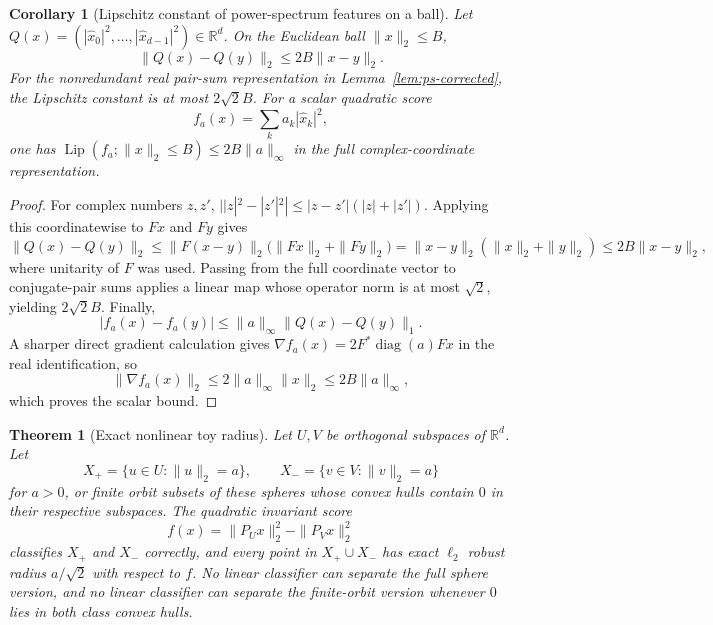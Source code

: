 \documentclass[11pt]{article}
\theoremstyle{plain}
\newtheorem{theorem}{Theorem}
\newtheorem{corollary}{Corollary}
\theoremstyle{definition}
\theoremstyle{remark}
\newcommand{\R}{\mathbb{R}}
\newcommand{\Lip}{\operatorname{Lip}}
\begin{document}
\begin{corollary}[Lipschitz constant of power-spectrum features on a ball]\label{cor:ps-lip}
Let $Q(x)=(|\hat x_0|^2,\ldots,|\hat x_{d-1}|^2)\in\R^d$.  On the Euclidean ball $\|x\|_2\le B$,
\[
\|Q(x)-Q(y)\|_2\le 2B\|x-y\|_2.
\]
For the nonredundant real pair-sum representation in Lemma~\ref{lem:ps-corrected}, the Lipschitz constant is at most $2\sqrt2 B$.  For a scalar quadratic score
\[
f_a(x)=\sum_k a_k|\hat x_k|^2,
\]
one has $\Lip(f_a;\|x\|_2\le B)\le 2B\|a\|_\infty$ in the full complex-coordinate representation.
\end{corollary}

\begin{proof}
For complex numbers $z,z'$, $||z|^2-|z'|^2|\le |z-z'|(|z|+|z'|)$.  Applying this coordinatewise to $Fx$ and $Fy$ gives
\[
\|Q(x)-Q(y)\|_2
\le \|F(x-y)\|_2\big(\|Fx\|_2+\|Fy\|_2\big)
=\|x-y\|_2(\|x\|_2+\|y\|_2)
\le 2B\|x-y\|_2,
\]
where unitarity of $F$ was used.  Passing from the full coordinate vector to conjugate-pair sums applies a linear map whose operator norm is at most $\sqrt2$, yielding $2\sqrt2B$.  Finally,
\[
|f_a(x)-f_a(y)|\le \|a\|_\infty\|Q(x)-Q(y)\|_1.
\]
A sharper direct gradient calculation gives $\nabla f_a(x)=2F^*\operatorname{diag}(a)Fx$ in the real identification, so
\[
\|\nabla f_a(x)\|_2\le 2\|a\|_\infty\|x\|_2\le 2B\|a\|_\infty,
\]
which proves the scalar bound.
\end{proof}

\begin{theorem}[Exact nonlinear toy radius]\label{thm:toy-radius}
Let $U,V$ be orthogonal subspaces of $\R^d$.  Let
\[
X_+=\{u\in U:\|u\|_2=a\},\qquad X_-=
\{v\in V:\|v\|_2=a\}
\]
for $a>0$, or finite orbit subsets of these spheres whose convex hulls contain $0$ in their respective subspaces.  The quadratic invariant score
\[
f(x)=\|P_Ux\|_2^2-\|P_Vx\|_2^2
\]
classifies $X_+$ and $X_-$ correctly, and every point in $X_+\cup X_-$ has exact $\ell_2$ robust radius $a/\sqrt2$ with respect to $f$.  No linear classifier can separate the full sphere version, and no linear classifier can separate the finite-orbit version whenever $0$ lies in both class convex hulls.
\end{theorem}
\end{document}
